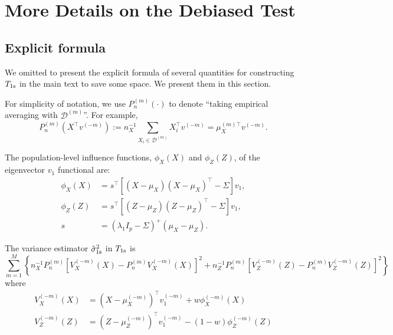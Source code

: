\documentclass[11pt]{article}
\begin{document}
\section{More Details on the Debiased Test}

\subsection{Explicit formula}\label{app: explicit formula}

We omitted to present the explicit formula of several quantities for constructing $T_{\rm 1s}$ in the main text to save some space. We present them in this section.

For simplicity of notation, we use $P_n^{(m)}(\cdot)$ to denote ``taking empirical averaging with $\mathcal{D}^{(m)}$''. For example,
\begin{equation*}
    P_n^{(m)} (X^\top v^{(-m)}) := n_X^{-1}\sum_{X_i\in\mathcal{D}^{(m)}} X_i^\top v^{(-m)} = \mu_X^{(m)\top}v^{(-m)}.
\end{equation*}

The population-level influence functions, $\phi_X(X)$ and $\phi_Z(Z)$, of the eigenvector $v_1$ functional  are:
\begin{equation}\label{eq: define_true_influence}
    \begin{aligned}
\phi_X(X) & =s^{\top}\left[\left(X-\mu_X\right)\left(X-\mu_X \right)^{\top}-\Sigma \right] v_1 , \\
\phi_Z (Z) & =s^{ \top}\left[\left(Z-\mu_Z \right)\left(Z-\mu_Z \right)^{\top}-\Sigma \right] v_1 , \\
s  & =\left(\lambda_1 I_p-\Sigma \right)^{+}\left(\mu_X -\mu_Z \right) .
\end{aligned}
\end{equation}

The variance estimator $\hat{\sigma}_{\rm 1s}^2$ in $T_{\rm 1s}$ is 
\begin{equation}\label{eq:debiased test standard error}
        \sum_{m=1}^M\left\{n_X^{-1} P_n^{(m)}\left[V_X^{(-m)}(X)-P_n^{(m)} V_X^{(-m)}(X)\right]^2+n_Z^{-1} P_n^{(m)}\left[V_Z^{(-m)}(Z)-P_n^{(m)} V^{(-m)}_Z(Z)\right]^2\right\}   
\end{equation}
where
\begin{equation*}
    \begin{aligned}
        V_X^{(-m)}(X)& = \left(X-\mu_X^{(-m)}\right)^{\top} v_1^{(-m)}+w \phi_X^{(-m)}(X)\\
        V_Z^{(-m)}(Z)& =\left(Z-\mu_Z^{(-m)}\right)^{\top} v_1^{(-m)}-(1-w) \phi_Z^{(-m)}(Z)
    \end{aligned}
\end{equation*}
\end{document}

